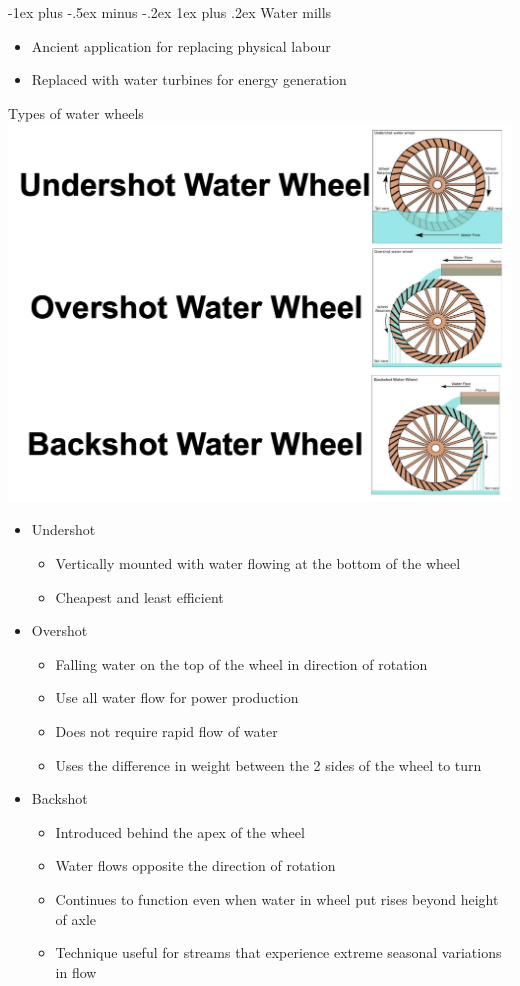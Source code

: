 \documentclass{article}
\makeatletter
\renewcommand{\subsubsection}{\@startsection{subsubsection}{3}{0mm}%
    {-1ex plus -.5ex minus -.2ex}%
    {1ex plus .2ex}%
{\normalfont\small\bfseries}}%
\makeatother
\begin{document}
\begin{multicols*}{4}
\subsubsection{Water mills}
\begin{itemize}
	\item Ancient application for replacing physical labour
	\item Replaced with water turbines for energy generation
\end{itemize}
Types of water wheels\\
\includegraphics[scale=0.3]{water-wheels}
\begin{itemize}
	\item Undershot
	\begin{itemize}
		\item Vertically mounted with water flowing at the bottom of the wheel
		\item Cheapest and least efficient
	\end{itemize}
	\item Overshot
	\begin{itemize}
		\item Falling water on the top of the wheel in direction of rotation
		\item Use all water flow for power production 
		\item Does not require rapid flow of water
		\item Uses the difference in weight between the 2 sides of the wheel to turn
	\end{itemize}
	\item Backshot
	\begin{itemize}
		\item Introduced behind the apex of the wheel
		\item Water flows opposite the direction of rotation
		\item Continues to function even when water in wheel put rises beyond height of axle
		\item Technique useful for streams that experience extreme seasonal variations in flow
	\end{itemize}
\end{itemize}


\end{multicols*}
\end{document}
